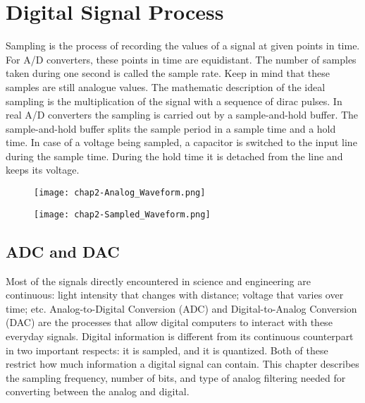 \chapter{Digital Signal Process} %

\label{Chapter2} %


\cite{wiki-dsp-sampling}
Sampling is the process of recording the values of a signal at given points in time. For A/D converters, these points in time are equidistant. The number of samples taken during one second is called the sample rate. Keep in mind that these samples are still analogue values. The mathematic description of the ideal sampling is the multiplication of the signal with a sequence of dirac pulses. In real A/D converters the sampling is carried out by a sample-and-hold buffer. The sample-and-hold buffer splits the sample period in a sample time and a hold time. In case of a voltage being sampled, a capacitor is switched to the input line during the sample time. During the hold time it is detached from the line and keeps its voltage.

\begin{figure}[ht]
  \centering
    \texttt{[image: chap2-Analog\_Waveform.png]}
  \caption{}
  \label{fig:chap2-Analog_Waveform}
\end{figure}

\begin{figure}[ht]
  \centering
    \texttt{[image: chap2-Sampled\_Waveform.png]}
  \caption{}
  \label{fig:chap2-Sampled_Waveform}
\end{figure}

\section{ADC and DAC}\cite{smith1997dspbook}
Most of the signals directly encountered in science and engineering are continuous: light intensity that changes with distance; voltage that varies over time; etc. Analog-to-Digital Conversion (ADC) and Digital-to-Analog Conversion (DAC) are the processes that allow digital computers to interact with these everyday signals. Digital information is different from its continuous counterpart in two important respects: it is sampled, and it is quantized. Both of these restrict how much information a digital signal can
contain. This chapter describes the sampling frequency, number of bits, and type of analog filtering needed for converting between the analog and digital.

